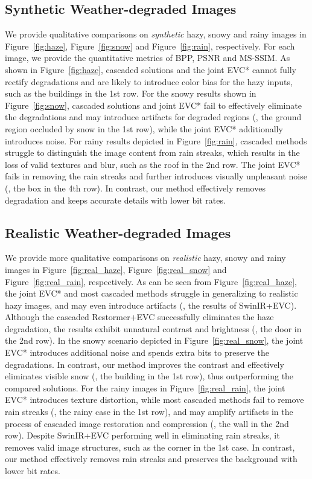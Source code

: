 \subsection{Synthetic Weather-degraded Images}\label{supp:syn}
We provide qualitative comparisons on \textit{synthetic} hazy, snowy and rainy images in Figure~\ref{fig:haze}, Figure~\ref{fig:snow} and Figure~\ref{fig:rain}, respectively. For each image, we provide the quantitative metrics of BPP, PSNR and MS-SSIM. As shown in Figure~\ref{fig:haze}, cascaded solutions and the joint EVC* cannot fully rectify degradations and are likely to introduce color bias for the hazy inputs, such as the buildings in the 1st row. For the snowy results shown in Figure~\ref{fig:snow}, cascaded solutions and joint EVC* fail to effectively eliminate the degradations and may introduce artifacts for degraded regions (\eg, the ground region occluded by snow in the 1st row), while the joint EVC* additionally introduces noise. For rainy results depicted in Figure~\ref{fig:rain}, cascaded methods struggle to distinguish the image content from rain streaks, which results in the loss of valid textures and blur, such as the roof in the 2nd row. The joint EVC* fails in removing the rain streaks and further introduces visually unpleasant noise (\eg, the box in the 4th row). In contrast, our method effectively removes degradation and keeps accurate details with lower bit rates.





 \subsection{Realistic Weather-degraded Images}\label{supp:real}
We provide more qualitative comparisons on \textit{realistic} hazy, snowy and rainy images in Figure~\ref{fig:real_haze}, Figure~\ref{fig:real_snow} and Figure~\ref{fig:real_rain}, respectively. As can be seen from Figure~\ref{fig:real_haze}, the joint EVC* and most cascaded methods struggle in generalizing to realistic hazy images, and may even introduce artifacts (\eg, the results of SwinIR+EVC). Although the cascaded Restormer+EVC successfully eliminates the haze degradation, the results exhibit unnatural contrast and brightness (\eg, the door in the 2nd row). In the snowy scenario depicted in Figure~\ref{fig:real_snow}, the joint EVC* introduces additional noise and spends extra bits to preserve the degradations. In contrast, our method improves the contrast and effectively eliminates visible snow (\eg, the building in the 1st row), thus outperforming the compared solutions. For the rainy images in Figure~\ref{fig:real_rain}, the joint EVC* introduces texture distortion, while most cascaded methods fail to remove rain streaks (\eg, the rainy case in the 1st row), and may amplify artifacts in the process of cascaded image restoration and compression (\eg, the wall in the 2nd row). Despite SwinIR+EVC performing well in eliminating rain streaks, it removes valid image structures, such as the corner in the 1st case. In contrast, our method effectively removes rain streaks and preserves the background with lower bit rates.

